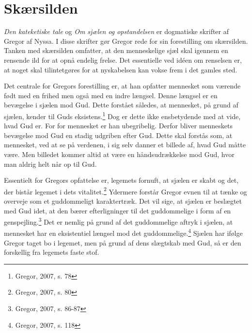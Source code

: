 \chapter{Skærsilden}
\textit{Den kateketiske tale} og \textit{Om sjælen og opstandelsen} er dogmatiske skrifter af Gregor af Nyssa. I disse skrifter gør Gregor rede for sin forestilling om skærsilden. Tanken med skærsilden omfatter, at den menneskelige sjæl skal igennem en rensende ild for at opnå endelig frelse. Det essentielle ved idéen om renselsen er, at noget skal tilintetgøres for at nyskabelsen kan vokse frem i det gamles sted.

Det centrale for Gregors forestilling er, at han opfatter mennesket som værende født med en frihed men også med en indre længsel. Denne længsel er en bevægelse i sjælen mod Gud. Dette forstået således, at mennesket, på grund af sjælen, kender til Guds eksistens.\footnote{Gregor, 2007, s. 78} Dog er dette ikke ensbetydende med at vide, hvad Gud er. For for mennesket er han ubegribelig. Derfor bliver menneskets bevægelse mod Gud en stadig udgriben efter Gud. Dette skal forstås som, at mennesket, ved at se på verdenen, i sig selv danner et billede af, hvad Gud måtte være. Men billedet kommer altid at være en håndsudrækkelse mod Gud, hvor man aldrig helt når op til Gud.

Essentielt for Gregors opfattelse er, legemets fornuft, at sjælen er skabt og det, der bistår legemet i dets vitalitet.\footnote{Gregor, 2007, s. 80} Ydermere forstår Gregor evnen til at tænke og overveje som et guddommeligt karaktertræk. Det vil sige, at sjælen er beslægtet med Gud idet, at den bærer efterligninger til det guddommelige i form af en genspejling.\footnote{Gregor, 2007, s. 86-87} Det er nemlig på grund af det guddommelige aftryk i sjælen, at mennesket har en eksistentiel længsel mod det guddommelige.\footnote{Gregor, 2007, s. 118} Sjælen har ifølge Gregor taget bo i legemet, men på grund af dens slægtskab med Gud, så er den forskellig fra legemets faste stof.

